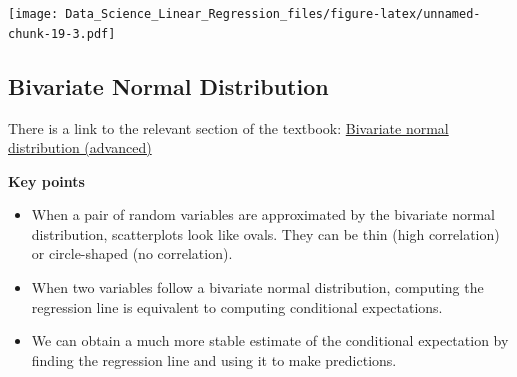 \documentclass[
]{article}
\newenvironment{Shaded}{\begin{snugshade}}{\end{snugshade}}
\newcommand{\CommentTok}[1]{\textcolor[rgb]{0.56,0.35,0.01}{\textit{#1}}}
\newcommand{\DataTypeTok}[1]{\textcolor[rgb]{0.13,0.29,0.53}{#1}}
\newcommand{\FloatTok}[1]{\textcolor[rgb]{0.00,0.00,0.81}{#1}}
\newcommand{\KeywordTok}[1]{\textcolor[rgb]{0.13,0.29,0.53}{\textbf{#1}}}
\newcommand{\NormalTok}[1]{#1}
\newcommand{\OperatorTok}[1]{\textcolor[rgb]{0.81,0.36,0.00}{\textbf{#1}}}
\newcommand{\StringTok}[1]{\textcolor[rgb]{0.31,0.60,0.02}{#1}}
\providecommand{\tightlist}{%
  \setlength{\itemsep}{0pt}\setlength{\parskip}{0pt}}
\begin{document}
\begin{Shaded}
\end{Shaded}

\texttt{[image: Data\_Science\_Linear\_Regression\_files/figure-latex/unnamed-chunk-19-3.pdf]}

\hypertarget{bivariate-normal-distribution}{%
\subsection{Bivariate Normal
Distribution}\label{bivariate-normal-distribution}}

There is a link to the relevant section of the textbook:
\href{https://rafalab.github.io/dsbook/regression.html\#bivariate-normal-distribution-advanced}{Bivariate
normal distribution (advanced)}

\textbf{Key points}

\begin{itemize}
\tightlist
\item
  When a pair of random variables are approximated by the bivariate
  normal distribution, scatterplots look like ovals. They can be thin
  (high correlation) or circle-shaped (no correlation).
\item
  When two variables follow a bivariate normal distribution, computing
  the regression line is equivalent to computing conditional
  expectations.
\item
  We can obtain a much more stable estimate of the conditional
  expectation by finding the regression line and using it to make
  predictions.
\end{itemize}
\end{document}
